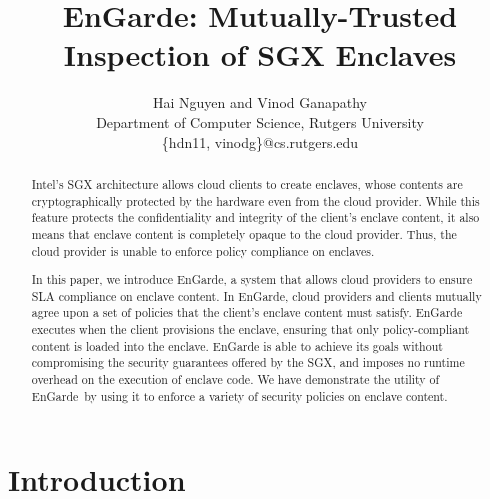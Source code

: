\documentclass[conference,compsoc]{IEEEtran}
\newcommand{\tool}{EnGarde\xspace} %
\begin{document}
\title{\tool: Mutually-Trusted Inspection of SGX Enclaves}
\author{Hai Nguyen and Vinod Ganapathy\\
Department of Computer Science, Rutgers University\\
\{hdn11, vinodg\}@cs.rutgers.edu}

\maketitle
\begin{abstract}
%
% 

\renewcommand{\baselinestretch}{0.8}
Intel's SGX architecture allows cloud clients to create enclaves, whose
contents are cryptographically protected by the hardware even from the cloud
provider. While this feature protects the confidentiality and integrity of the
client's enclave content, it also means that enclave content is completely
opaque to the cloud provider.  Thus, the cloud provider is unable to enforce
policy compliance on enclaves.

In this paper, we introduce \tool, a system that allows cloud providers to
ensure SLA compliance on enclave content. In \tool, cloud providers and clients
mutually agree upon a set of policies that the client's enclave content must
satisfy. \tool executes when the client provisions the enclave, ensuring that
only policy-compliant content is loaded into the enclave. \tool is able to
achieve its goals without compromising the security guarantees offered by the
SGX, and imposes no runtime overhead on the execution of enclave code. We have
demonstrate the utility of \tool\ by using it to enforce a variety of security
policies on enclave content.
\renewcommand{\baselinestretch}{1}

%
\end{abstract}


% 

\section{Introduction}
\label{section:introduction}
\end{document}
